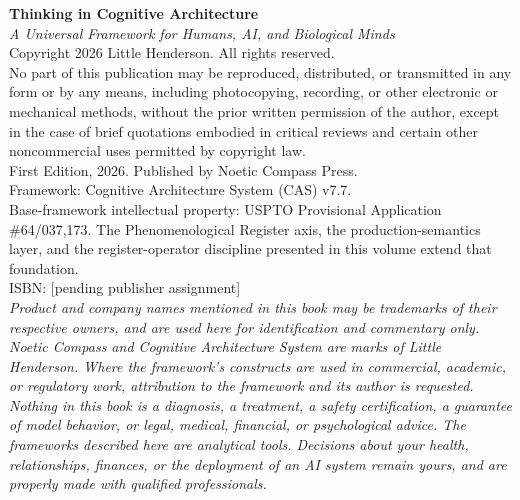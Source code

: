 \thispagestyle{empty}
\vspace*{\fill}
\begin{center}
\begin{minipage}{0.85\textwidth}
\small
\noindent
\textbf{Thinking in Cognitive Architecture}\\
\textit{A Universal Framework for Humans, AI, and Biological Minds}\\[6pt]
Copyright \textcopyright{} 2026 Little Henderson. All rights reserved.\\[6pt]
No part of this publication may be reproduced, distributed, or transmitted
in any form or by any means, including photocopying, recording, or other
electronic or mechanical methods, without the prior written permission of
the author, except in the case of brief quotations embodied in critical
reviews and certain other noncommercial uses permitted by copyright law.\\[6pt]
First Edition, 2026. Published by Noetic Compass Press.\\[6pt]
Framework: Cognitive Architecture System (CAS) v7.7.\\[6pt]
Base-framework intellectual property: USPTO Provisional Application
\#64/037,173. The Phenomenological Register axis, the production-semantics
layer, and the register-operator discipline presented in this volume extend
that foundation.\\[6pt]
ISBN: [pending publisher assignment]\\[6pt]
\textit{Product and company names mentioned in this book may be trademarks of
their respective owners, and are used here for identification and commentary
only.}\\[6pt]
\textit{Noetic Compass and Cognitive Architecture System are marks of
Little Henderson. Where the framework's constructs are used in commercial,
academic, or regulatory work, attribution to the framework and its author
is requested.}\\[6pt]
\textit{Nothing in this book is a diagnosis, a treatment, a safety
certification, a guarantee of model behavior, or legal, medical, financial,
or psychological advice. The frameworks described here are analytical tools.
Decisions about your health, relationships, finances, or the deployment of
an AI system remain yours, and are properly made with qualified
professionals.}
\end{minipage}
\end{center}
\vspace*{\fill}
\cleardoublepage

